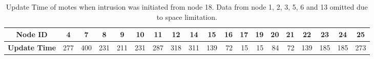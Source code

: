 \documentclass[conference,manuscript]{IEEEtran}
\newcommand*{\bd}[1]{\multicolumn{1}{|c|}{\bfseries #1}}
\begin{document}
\begin{table}[t!]
\centering
\begin{tabular}{|l|*{17}{r|}r|}
\hline
\bd{Node ID}           & \bd{4} & \bd{7} & \bd{8} & \bd{9} & \bd{10} & \bd{11} & \bd{12} & \bd{14} & \bd{15} & \bd{16} & \bd{17} & \bd{19} & \bd{20} & \bd{21} & \bd{22} & \bd{23} & \bd{24} & \bd{25}\\
\hline
\bd{Update Time}  &   277 	&  400 	& 231 	& 211 	& 231 &	 287 	& 318 &	 311 &	 139 & 72 &	 15 &	 15 &	 84 	& 72 	& 139 &	 185 &	185 & 273 \\
\hline
\end{tabular}
\caption{Update Time of motes when intrusion was initiated from node 18. Data from node 1, 2, 3, 5, 6 and 13 omitted due to space limitation.}
\label{tab:tree_time_18}
\end{table}

\end{document}
